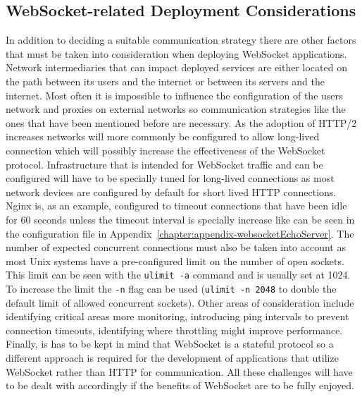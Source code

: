 \subsection{WebSocket-related Deployment Considerations}

In addition to deciding a suitable communication strategy there are other factors that must be taken into consideration when deploying WebSocket applications. Network intermediaries that can impact deployed services are either located on the path between its users and the internet or between its servers and the internet. Most often it is impossible to influence the configuration of the users network and proxies on external networks so communication strategies like the ones that have been mentioned before are necessary. As the adoption of HTTP/2 increases networks will more commonly be configured to allow long-lived connection which will possibly increase the effectiveness of the WebSocket protocol. Infrastructure that is intended for WebSocket traffic and can be configured will have to be specially tuned for long-lived connections as most network devices are configured by default for short lived HTTP connections. Nginx is, as an example, configured to timeout connections that have been idle for 60 seconds unless the timeout interval is specially increase like can be seen in the configuration file in Appendix~\ref{chapter:appendix-websocketEchoServer}. The number of expected concurrent connections must also be taken into account as most Unix systems have a pre-configured limit on the number of open sockets. This limit can be seen with the \texttt{ulimit -a} command and is usually set at 1024. To increase the limit the \texttt{-n} flag can be used (\texttt{ulimit -n 2048} to double the default limit of allowed concurrent sockets). Other areas of consideration include identifying critical areas more monitoring, introducing ping intervals to prevent connection timeouts, identifying where throttling might improve performance. Finally, is has to be kept in mind that WebSocket is a stateful protocol so a different approach is required for the development of applications that utilize WebSocket rather than HTTP for communication. All these challenges will have to be dealt with accordingly if the benefits of WebSocket are to be fully enjoyed.